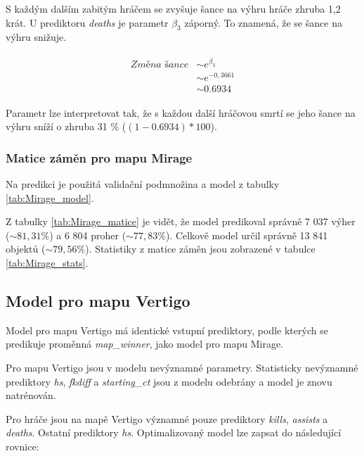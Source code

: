 S každým dalším zabitým hráčem se zvyšuje šance na výhru hráče zhruba 1,2 krát. U prediktoru \textit{deaths} je parametr $\beta_3$ záporný. To znamená, že se šance
na výhru snižuje.

\begin{align}
    \begin{split}
        \textit{Změna šance} &\sim e^{\beta_3} \\
                             &\sim e^{-0,3661} \\                     
                             &\sim 0.6934
    \end{split}
\end{align}

Parametr lze interpretovat tak, že s každou další hráčovou smrtí se jeho šance na výhru sníží o zhruba 31 \% ($(1 - 0.6934)*100$). 

\subsubsection{Matice záměn pro mapu Mirage}
Na predikci je použitá validační podmnožina a model z tabulky \ref{tab:Mirage_model}.





Z tabulky \ref{tab:Mirage_matice} je vidět, že model predikoval správně 7 037 výher ($\sim 81,31 \%$) a 6 804 proher ($\sim 77,83 \%$).
Celkově model určil správně 13 841 objektů ($\sim 79,56 \%$). Statistiky z matice záměn jsou zobrazené v tabulce \ref{tab:Mirage_stats}.

\newpage
\subsection{Model pro mapu Vertigo}
Model pro mapu Vertigo má identické vstupní prediktory, podle kterých se predikuje proměnná \textit{map\_winner}, jako model pro mapu Mirage.



Pro mapu Vertigo jsou v modelu nevýznamné parametry. Statisticky nevýznamné prediktory \textit{hs}, \textit{fkdiff} a \textit{starting\_ct}
jsou z modelu odebrány a model je znovu natrénován.



Pro hráče jsou na mapě Vertigo významné pouze prediktory \textit{kills}, \textit{assists} a \textit{deaths}. Ostatní prediktory \textit{hs}.
Optimalizovaný model lze zapsat do následující rovnice:

